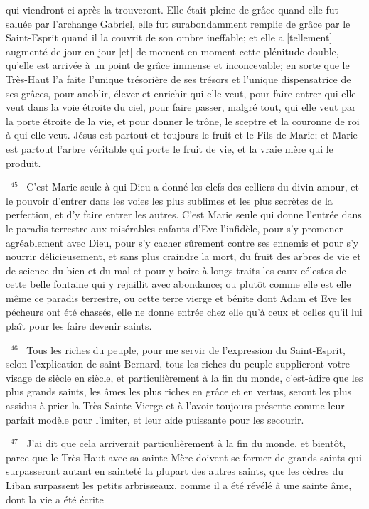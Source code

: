 \documentclass[paper=a5,pagesize=pdftex,fontsize=15pt,headinclude=on,twoside=off]{scrbook}
\newcommand{\negphantom}[1]{\settowidth{\dimen0}{#1}\hspace*{-\dimen0}}
\newcommand{\versenb}[1]{\par \vspace{10pt}~\negphantom{~${}^{#1}$~}${}^{#1}$~}
\begin{document}
qui viendront ci-après la trouveront. Elle était pleine de grâce quand elle fut saluée par l'archange Gabriel, elle fut
surabondamment remplie de grâce par le Saint-Esprit quand il la couvrit de son ombre ineffable; et elle a
[tellement] augmenté de jour en jour [et] de moment en moment cette plénitude double, qu'elle est arrivée à un
point de grâce immense et inconcevable; en sorte que le Très-Haut l'a faite l'unique trésorière de ses trésors et
l'unique dispensatrice de ses grâces, pour anoblir, élever et enrichir qui elle veut, pour faire entrer qui elle veut
dans la voie étroite du ciel, pour faire passer, malgré tout, qui elle veut par la porte étroite de la vie, et pour donner
le trône, le sceptre et la couronne de roi à qui elle veut. Jésus est partout et toujours le fruit et le Fils de Marie; et
Marie est partout l'arbre véritable qui porte le fruit de vie, et la vraie mère qui le produit.
\versenb{45} C'est Marie seule à qui Dieu a donné les clefs des celliers du divin amour, et le pouvoir d'entrer dans les voies
les plus sublimes et les plus secrètes de la perfection, et d'y faire entrer les autres. C'est Marie seule qui donne
l'entrée dans le paradis terrestre aux misérables enfants d'Eve l'infidèle, pour s'y promener agréablement avec
Dieu, pour s'y cacher sûrement contre ses ennemis et pour s'y nourrir délicieusement, et sans plus craindre la
mort, du fruit des arbres de vie et de science du bien et du mal et pour y boire à longs traits les eaux célestes de
cette belle fontaine qui y rejaillit avec abondance; ou plutôt comme elle est elle même ce paradis terrestre, ou cette
terre vierge et bénite dont Adam et Eve les pécheurs ont été chassés, elle ne donne entrée chez elle qu'à ceux et
celles qu'il lui plaît pour les faire devenir saints.
\versenb{46} Tous les riches du peuple, pour me servir de l'expression du Saint-Esprit, selon l'explication de saint Bernard,
tous les riches du peuple supplieront votre visage de siècle en siècle, et particulièrement à la fin du monde, c'est-àdire que les plus grands saints, les âmes les plus riches en grâce et en vertus, seront les plus assidus à prier la
Très Sainte Vierge et à l'avoir toujours présente comme leur parfait modèle pour l'imiter, et leur aide puissante
pour les secourir.
\versenb{47} J'ai dit que cela arriverait particulièrement à la fin du monde, et bientôt, parce que le Très-Haut avec sa sainte
Mère doivent se former de grands saints qui surpasseront autant en sainteté la plupart des autres saints, que les
cèdres du Liban surpassent les petits arbrisseaux, comme il a été révélé à une sainte âme, dont la vie a été écrite
\end{document}
